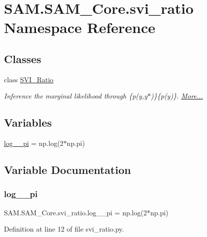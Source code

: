 \hypertarget{namespaceSAM_1_1SAM__Core_1_1svi__ratio}{}\section{S\+A\+M.\+S\+A\+M\+\_\+\+Core.\+svi\+\_\+ratio Namespace Reference}
\label{namespaceSAM_1_1SAM__Core_1_1svi__ratio}
\subsection*{Classes}
\begin{DoxyCompactItemize}
\item 
class \hyperlink{group__icubclient__SAM__Core_classSAM_1_1SAM__Core_1_1svi__ratio_1_1SVI__Ratio}{S\+V\+I\+\_\+\+Ratio}
\begin{DoxyCompactList}\small\item\em Inference the marginal likelihood through \{p(y,y$\ast$)\}\{p(y)\}.  \hyperlink{group__icubclient__SAM__Core_classSAM_1_1SAM__Core_1_1svi__ratio_1_1SVI__Ratio}{More...}\end{DoxyCompactList}\end{DoxyCompactItemize}
\subsection*{Variables}
\begin{DoxyCompactItemize}
\item 
\hyperlink{namespaceSAM_1_1SAM__Core_1_1svi__ratio_a99fdf39ac35c05674890532411a8c1a6}{log\+\_\+\_\+pi} = np.\+log(2$\ast$np.\+pi)
\end{DoxyCompactItemize}


\subsection{Variable Documentation}
\mbox{\label{namespaceSAM_1_1SAM__Core_1_1svi__ratio_a99fdf39ac35c05674890532411a8c1a6}} 
\subsubsection{\texorpdfstring{log\+\_\+\_\+pi}{log\_2\_pi}}
{\footnotesize\ttfamily S\+A\+M.\+S\+A\+M\+\_\+\+Core.\+svi\+\_\+ratio.\+log\+\_\+\_\+pi = np.\+log(2$\ast$np.\+pi)}



Definition at line 12 of file svi\+\_\+ratio.\+py.

